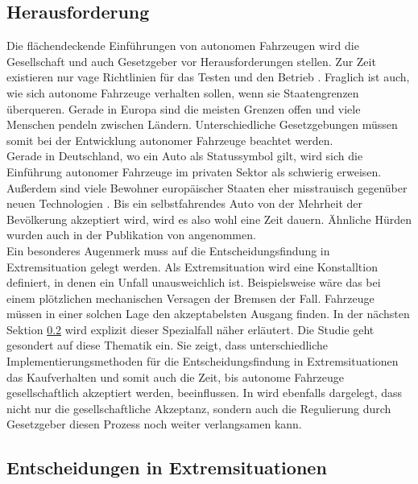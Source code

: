 \subsection{Herausforderung}

Die flächendeckende Einführungen von autonomen Fahrzeugen wird die Gesellschaft und auch Gesetzgeber vor Herausforderungen stellen. Zur Zeit existieren nur vage Richtlinien für das Testen und den Betrieb \cite{doi:10.1080/01441647.2018.1494640}. Fraglich ist auch, wie sich autonome Fahrzeuge verhalten sollen, wenn sie Staatengrenzen überqueren. Gerade in Europa sind die meisten Grenzen offen und viele Menschen pendeln zwischen Ländern. Unterschiedliche Gesetzgebungen müssen somit bei der Entwicklung autonomer Fahrzeuge beachtet werden.\\

Gerade in Deutschland, wo ein Auto als Statussymbol gilt, wird sich die Einführung autonomer Fahrzeuge im privaten Sektor als schwierig erweisen. Außerdem sind viele Bewohner europäischer Staaten eher misstrauisch gegenüber neuen Technologien \cite{technikRadar2019}. Bis ein selbstfahrendes Auto von der Mehrheit der Bevölkerung akzeptiert wird, wird es also wohl eine Zeit dauern. Ähnliche Hürden wurden auch in der Publikation \cite{roadblocks} von \citeauthor{roadblocks} angenommen.\\

Ein besonderes Augenmerk muss auf die Entscheidungsfindung in Extremsituation gelegt werden. Als Extremsituation wird eine Konstalltion definiert, in denen ein Unfall unausweichlich ist. Beispielsweise wäre das bei einem plötzlichen mechanischen Versagen der Bremsen der Fall. Fahrzeuge müssen in einer solchen Lage den akzeptabelsten Ausgang finden. In der nächsten Sektion \ref{ssec:entscheidungen-in-extremsituationen} wird explizit dieser Spezialfall näher erläutert. Die Studie \cite{socialDilemma} geht gesondert auf diese Thematik ein. Sie zeigt, dass unterschiedliche Implementierungsmethoden für die Entscheidungsfindung in Extremsituationen das Kaufverhalten und somit auch die Zeit, bis autonome Fahrzeuge gesellschaftlich akzeptiert werden, beeinflussen. In \citeauthor{socialDilemma} wird ebenfalls dargelegt, dass nicht nur die gesellschaftliche Akzeptanz, sondern auch die Regulierung durch Gesetzgeber diesen Prozess noch weiter verlangsamen kann.\\


\subsection{Entscheidungen in Extremsituationen}
\label{ssec:entscheidungen-in-extremsituationen}

